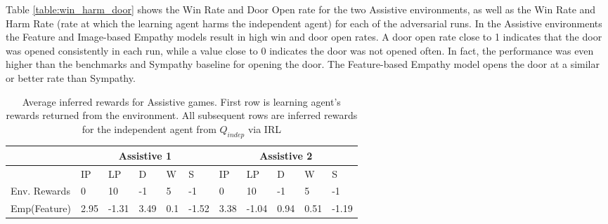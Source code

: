 Table \ref{table:win_harm_door} shows the Win Rate and Door Open rate for the two Assistive environments, as well as the Win Rate and Harm Rate (rate at which the learning agent harms the independent agent) for each of the adversarial runs. In the Assistive environments the Feature and Image-based Empathy models result in high win and door open rates. A door open rate close to 1 indicates that the door was opened consistently in each run, while a value close to 0 indicates the door was not opened often. In fact, the performance was even higher than the benchmarks and Sympathy baseline for opening the door. The Feature-based Empathy model opens the door at a similar or better rate than Sympathy.

\iffalse
\begin{table*}[]
\caption{Average inferred rewards for Assistive games. First row is learning agent's rewards returned from the environment. All subsequent rows are inferred rewards for the independent agent from $\hat{Q}_{indep}$ via IRL}
\begin{center}
\begin{tabular}{lllllllllll}
\hline
\multicolumn{1}{|l|}{}             & \multicolumn{5}{c|}{Assistive 1}                                                                                                              & \multicolumn{5}{c|}{Assistive 2}                                                                                                              \\ \hline
\multicolumn{1}{|l|}{}             & \multicolumn{1}{l|}{IP}   & \multicolumn{1}{l|}{LP}    & \multicolumn{1}{l|}{D}     & \multicolumn{1}{l|}{W}     & \multicolumn{1}{l|}{S}     & \multicolumn{1}{l|}{IP}   & \multicolumn{1}{l|}{LP}    & \multicolumn{1}{l|}{D}     & \multicolumn{1}{l|}{W}     & \multicolumn{1}{l|}{S}     \\ \hline
\rowcolor[HTML]{C0C0C0} 
Env. Rewards                       & 0                         & 10                         & -1                         & 5                          & -1                         & 0                         & 10                         & -1                         & 5                          & -1                         \\ \hline
\multicolumn{1}{|l|}{Emp(Feature)} & \multicolumn{1}{l|}{2.95} & \multicolumn{1}{l|}{-1.31} & \multicolumn{1}{l|}{3.49}  & \multicolumn{1}{l|}{0.1}   & \multicolumn{1}{l|}{-1.52} & \multicolumn{1}{l|}{3.38} & \multicolumn{1}{l|}{-1.04} & \multicolumn{1}{l|}{0.94}  & \multicolumn{1}{l|}{0.51}  & \multicolumn{1}{l|}{-1.19} \\ \hline

\end{tabular}
\end{center}
\end{table*}
